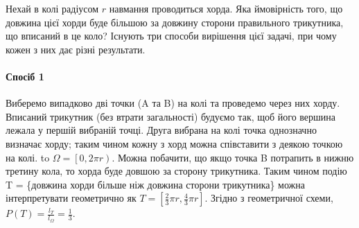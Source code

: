 \begin{example}
    Нехай в колі радіусом $r$ навмання проводиться хорда. Яка ймовірність того, 
    що довжина цієї хорди буде більшою за довжину сторони правильного трикутника, 
    що вписаний в це коло?
    \newline
    Існують три способи вирішення цієї задачі, при чому кожен з них дає різні 
    результати.
    \paragraph*{Спосіб 1}
    Виберемо випадково дві точки (A та B) на колі та проведемо через них хорду.
    Вписаний трикутник (без втрати загальності) 
    будуємо так, щоб його вершина лежала у першій вибраній точці. Друга вибрана на колі 
    точка однозначно визначає хорду; таким чином кожну з хорд можна співставити з 
    деякою точкою на колі. 
    \newline
    \hbox to 
    $\Omega = \left[0, 2\pi r\right).$ Можна побачити, що якщо точка B потрапить 
    в нижню третину кола, то хорда буде довшою за сторону трикутника. Таким чином 
    подію T = \{довжина хорди більше ніж довжина сторони трикутника\} 
    можна інтерпретувати геометрично як $T = [\frac{2}{3}\pi r, \frac{4}{3}\pi r]$.
    Згідно з геометричної схеми, $P(T) = \frac{l_T}{l_\Omega} = \frac{1}{3}$.

\end{example}
